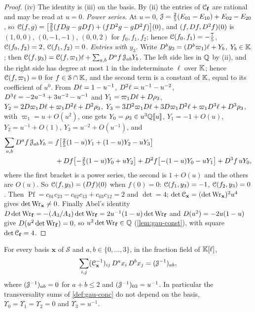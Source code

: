 \begin{proof}
(iv) The identity is (iii) on the basis. By (ii) the entries of $\mathcal{C}_{\mathbf f}$ are rational and may be read at $u=0$. \emph{Power series.} At $u=0$, $\mathcal{J}=\frac25(E_{01}-E_{10})+E_{02}-E_{20}$, so $\mathcal{C}(f,g)=\bigl[\frac25(fD g-gD f)+(fD^2g-gD^2f)\bigr](0)$, and $(f,D f,D^2f)(0)$ is $(1,0,0)$, $(0,-1,-1)$, $(0,0,2)$ for $f_0,f_1,f_2$; hence $\mathcal{C}(f_0,f_1)=-\frac75$, $\mathcal{C}(f_0,f_2)=2$, $\mathcal{C}(f_1,f_2)=0$. \emph{Entries with $y_3$.} Write $D^by_3=(D^b\varpi_1)\ell+Y_b$, $Y_b\in\mathbb{K}$; then $\mathcal{C}(f,y_3)=\mathcal{C}(f,\varpi_1)\ell+\sum_{a,b}D^af\,\mathcal{J}_{ab}Y_b$. The left side lies in $\mathbb{Q}$ by (ii), and the right side has degree at most $1$ in the indeterminate $\ell$ over $\mathbb{K}$; hence $\mathcal{C}(f,\varpi_1)=0$ for $f\in\mathcal S\cap\mathbb{K}$, and the second term is a constant of $\mathbb{K}$, equal to its coefficient of $u^0$. From $D\ell=1-u^{-1}$, $D^2\ell=u^{-1}-u^{-2}$, $D^3\ell=-2u^{-3}+3u^{-2}-u^{-1}$ and $Y_1=\varpi_1D\ell+D\rho_3$, $Y_2=2D\varpi_1D\ell+\varpi_1D^2\ell+D^2\rho_3$, $Y_3=3D^2\varpi_1D\ell+3D\varpi_1D^2\ell+\varpi_1D^3\ell+D^3\rho_3$, with $\varpi_1=u+O(u^2)$, one gets $Y_0=\rho_3\in u^3\mathbb{Q}[\![ u ]\!]$, $Y_1=-1+O(u)$, $Y_2=u^{-1}+O(1)$, $Y_3=u^{-2}+O(u^{-1})$, and
\[
\begin{aligned}\sum_{a,b}D^af\,\mathcal{J}_{ab}Y_b={}&f\bigl[\tfrac25(1-u)Y_1+(1-u)Y_2-uY_3\bigr]\\
&+D f\bigl[-\tfrac25(1-u)Y_0+uY_2\bigr]+D^2f\bigl[-(1-u)Y_0-uY_1\bigr]+D^3f\,uY_0 ,\end{aligned}
\]
where the first bracket is a power series, the second is $1+O(u)$ and the others are $O(u)$. So $\mathcal{C}(f,y_3)=(D f)(0)$ when $f(0)=0$: $\mathcal{C}(f_1,y_3)=-1$, $\mathcal{C}(f_2,y_3)=0$. Then $\operatorname{Pf}=c_{01}c_{23}-c_{02}c_{13}+c_{03}c_{12}=2$ and $\det=4$; $\det\mathcal{C}_{\mathbf x}=(\det\operatorname{Wr}_{\mathbf x})^2u^4$ gives $\det\operatorname{Wr}_{\mathbf x}\neq0$. Finally Abel's identity $D\det\operatorname{Wr}_{\mathbf f}=-(A_3/A_4)\det\operatorname{Wr}_{\mathbf f}=2u^{-1}(1-u)\det\operatorname{Wr}_{\mathbf f}$ and $D(u^2)=-2u(1-u)$ give $D(u^2\det\operatorname{Wr}_{\mathbf f})=0$, so $u^2\det\operatorname{Wr}_{\mathbf f}\in\mathbb{Q}$ (\cref{lem:gau-const}), with square $\det\mathcal{C}_{\mathbf f}=4$.
\end{proof}

\begin{lem}[Transversality]
\label{lem:gau-transv}
For every basis $\mathbf x$ of $\mathcal S$ and $a,b\in\{0,\dots,3\}$, in the fraction field of $\mathbb{K}[\ell]$,
\[
\sum_{i,j}(\mathcal{C}_{\mathbf x}^{-1})_{ij}\,D^ax_i\,D^bx_j=(\mathcal{J}^{-1})_{ab},
\]
where $(\mathcal{J}^{-1})_{ab}=0$ for $a+b\leq2$ and $(\mathcal{J}^{-1})_{03}=u^{-1}$. In particular the transversality sums of \cref{def:gau-conc} do not depend on the basis, $\Upsilon_0=\Upsilon_1=\Upsilon_2=0$ and $\Upsilon_3=u^{-1}$.
\end{lem}

